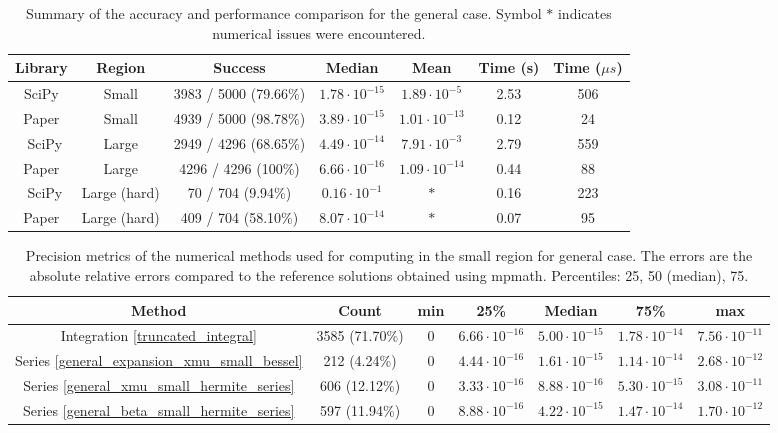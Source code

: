 \documentclass[10pt,a4paper,oneside]{article}
\numberwithin{equation}{section}
\begin{document}
\begin{table}[htbp]
\centering
\scalebox{0.9}
{
\begin{tabular}{ccccc|cc}
\hline
Library & Region & Success & Median & Mean & Time (s) & Time ($\mu s$)\\
\hline
SciPy & Small & 3983 / 5000 (79.66\%) &  $1.78\cdot 10^{-15}$ & $1.89 \cdot 10^{-5}$ & 2.53 & 506\\
Paper & Small & 4939 / 5000 (98.78\%) & $3.89\cdot 10^{-15}$ & $1.01\cdot 10^{-13}$ & 0.12 & 24\\
	\hline\
SciPy & Large & 2949 / 4296 (68.65\%) & $4.49\cdot 10^{-14}$ & $7.91\cdot 10^{-3}$ & 2.79 & 559\\
Paper & Large & 4296 / 4296 (100\%) & $6.66\cdot 10^{-16}$ & $1.09\cdot 10^{-14}$ & 0.44 &88\\
	\hline\
SciPy & Large (hard) & 70 / 704 (9.94\%) & $0.16\cdot 10^{-1}$ & $*$ & 0.16 & 223\\
Paper & Large (hard) & 409 / 704 (58.10\%) & $8.07\cdot 10^{-14}$ & $*$ & 0.07 & 95\\
	\hline
\end{tabular}
}
	\caption{Summary of the accuracy and performance comparison for the general case. Symbol $*$ indicates numerical issues were encountered.}
	\label{table_comparison_case_general_sumamry}
\end{table}

\begin{table}[htbp]
\centering
\scalebox{0.9}
{
\begin{tabular}{ccccccc}
\hline
Method & Count & min & 25\% & Median & 75\% & max\\
\hline
Integration \eqref{truncated_integral} & 3585 (71.70\%) & 0 & $6.66\cdot 10^{-16}$ & $5.00\cdot 10^{-15}$ & $1.78\cdot 10^{-14}$ & $7.56\cdot 10^{-11}$\\
Series \eqref{general_expansion_xmu_small_bessel} & 212 (4.24\%) & 0 & $4.44\cdot 10^{-16}$ & $1.61\cdot 10^{-15}$ & $1.14\cdot 10^{-14}$ & $2.68\cdot 10^{-12}$\\
Series \eqref{general_xmu_small_hermite_series} & 606 (12.12\%) & 0 & $3.33\cdot 10^{-16}$ & $8.88\cdot 10^{-16}$ & $5.30\cdot 10^{-15}$ & $3.08\cdot 10^{-11}$\\
Series \eqref{general_beta_small_hermite_series} & 597 (11.94\%) & 0 & $8.88\cdot 10^{-16}$ & $4.22\cdot 10^{-15}$ & $1.47\cdot 10^{-14}$ & $1.70\cdot 10^{-12}$\\
	\hline
\end{tabular}
}
	\caption{Precision metrics of the numerical methods used for computing in the small region for general case. The errors are the absolute relative errors compared to the reference solutions obtained using mpmath. Percentiles: 25, 50 (median), 75.}
	\label{table_methods_case_general_small}
\end{table}
\end{document}
